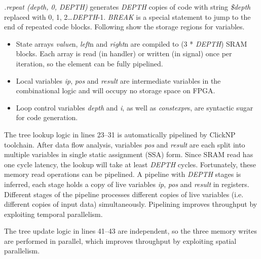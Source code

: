 \textit{.repeat (depth, 0, DEPTH)} generates \textit{DEPTH} copies of code with string \textit{\$depth} replaced with 0, 1, 2\ldots \textit{DEPTH}-1. \textit{BREAK} is a special statement to jump to the end of repeated code blocks. Following show the storage regions for variables.

\begin{itemize}
	\item State arrays \textit{value}n, \textit{left}n and \textit{right}n are compiled to (3 * \textit{DEPTH}) SRAM blocks. Each array is read (in handler) or written (in signal) once per iteration, so the element can be fully pipelined.
	\item Local variables \textit{ip}, \textit{pos} and \textit{result} are intermediate variables in the combinational logic and will occupy no storage space on FPGA.
	\item Loop control variables \textit{depth} and \textit{i}, as well as \textit{constexpr}s, are syntactic sugar for code generation.
\end{itemize}

The tree lookup logic in lines 23--31 is automatically pipelined by ClickNP toolchain. After data flow analysis, variables \textit{pos} and \textit{result} are each split into multiple variables in single static assignment (SSA) form. Since SRAM read has one cycle latency, the lookup will take at least \textit{DEPTH} cycles. Fortunately, these memory read operations can be pipelined. A pipeline with \textit{DEPTH} stages is inferred, each stage holds a copy of live variables \textit{ip}, \textit{pos} and \textit{result} in registers. Different stages of the pipeline processes different copies of live variables (i.e. different copies of input data) simultaneously. Pipelining improves throughput by exploiting temporal parallelism.

The tree update logic in lines 41--43 are independent, so the three memory writes are performed in parallel, which improves throughput by exploiting spatial parallelism.

